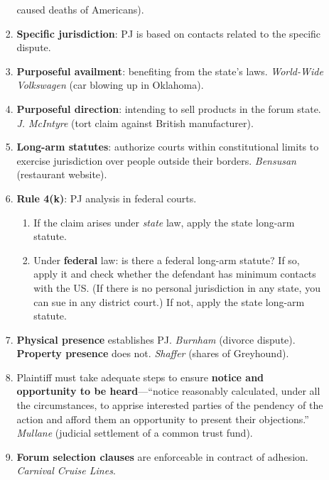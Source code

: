 \begin{enumerate}
\begin{enumerate}
\begin{enumerate}
            caused deaths of Americans).
            \item \textbf{Specific jurisdiction}: PJ is based on contacts 
            related to the specific dispute.
            \item \textbf{Purposeful availment}: benefiting from the state's 
            laws. \emph{World-Wide Volkswagen} (car blowing up in Oklahoma).
            \item \textbf{Purposeful direction}: intending to sell products in 
            the forum state. \emph{J. McIntyre} (tort claim against British 
            manufacturer).
            \item \textbf{Long-arm statutes}: authorize courts within 
            constitutional limits to exercise jurisdiction over people outside 
            their borders. \emph{Bensusan} (restaurant website).
            \item \textbf{Rule 4(k)}: PJ analysis in federal courts. 
            \begin{enumerate}
                \item If the claim arises under \emph{state} law, apply the 
                state long-arm statute.
                \item Under \textbf{federal} law: is there a federal long-arm 
                statute? If so, apply it and check whether the defendant has 
                minimum contacts with the US.  (If there is no personal 
                jurisdiction in any state, you can sue in any district court.) 
                If not, apply the state long-arm statute. 
            \end{enumerate}
            \item \textbf{Physical presence} establishes PJ. \emph{Burnham} 
            (divorce dispute). \textbf{Property presence} does not. 
            \emph{Shaffer} (shares of Greyhound).
            \item Plaintiff must take adequate steps to ensure \textbf{notice and 
            opportunity to be heard}---``notice reasonably calculated, under 
            all the circumstances, to apprise interested parties of the 
            pendency of the action and afford them an opportunity to present 
            their objections.'' \emph{Mullane} (judicial settlement of a 
            common trust fund).
            \item \textbf{Forum selection clauses} are enforceable in contract 
            of adhesion. \emph{Carnival Cruise Lines}.
        \end{enumerate}

\end{enumerate}
\end{enumerate}
